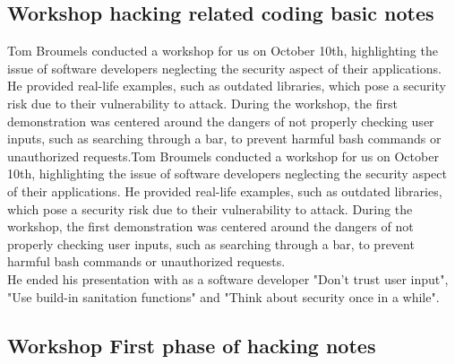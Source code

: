 \documentclass[12pt, letterpaper]{article}
\begin{document}
\subsection{Workshop hacking related coding basic notes}
\label{workshop:week1}
Tom Broumels conducted a workshop for us on October 10th, highlighting the issue of software developers neglecting the security aspect of their applications. He provided real-life examples, such as outdated libraries, which pose a security risk due to their vulnerability to attack. During the workshop, the first demonstration was centered around the dangers of not properly checking user inputs, such as searching through a bar, to prevent harmful bash commands or unauthorized requests.Tom Broumels conducted a workshop for us on October 10th, highlighting the issue of software developers neglecting the security aspect of their applications. He provided real-life examples, such as outdated libraries, which pose a security risk due to their vulnerability to attack. During the workshop, the first demonstration was centered around the dangers of not properly checking user inputs, such as searching through a bar, to prevent harmful bash commands or unauthorized requests.
\hfill\break
\\
He ended his presentation with as a software developer "Don't trust user input", "Use build-in sanitation functions" and "Think about security once in a while".



\newpage
\subsection{Workshop First phase of hacking notes}
\label{workshop:week2}
\newpage



\newpage
\end{document}
